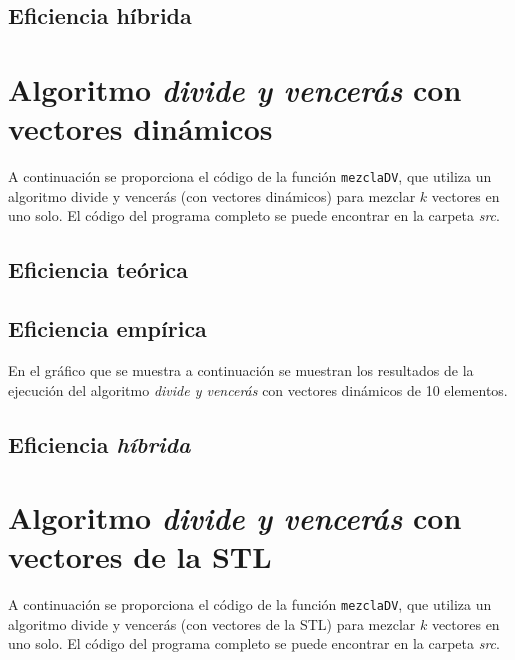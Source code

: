 \documentclass[11pt]{article}
\begin{document}
 \subsection*{Eficiencia híbrida}

\section*{Algoritmo \textit{divide y vencerás} con vectores dinámicos}

A continuación se proporciona el código de la función \texttt{mezclaDV},
que utiliza un algoritmo divide y vencerás (con vectores dinámicos) para mezclar $k$ vectores en uno solo. El
código del programa completo se puede encontrar en la carpeta \textit{src}.\\



\subsection*{Eficiencia teórica}

\subsection*{Eficiencia empírica}

En el gráfico que se muestra a continuación se muestran los resultados de la
ejecución del algoritmo \textit{divide y vencerás} con vectores dinámicos de 10 elementos.

\begin{center}
	
\end{center}

\subsection*{Eficiencia \textit{híbrida}}

\section*{Algoritmo \textit{divide y vencerás} con vectores de la STL}


A continuación se proporciona el código de la función \texttt{mezclaDV},
que utiliza un algoritmo divide y vencerás (con vectores de la STL) para mezclar $k$ vectores en uno solo. El
código del programa completo se puede encontrar en la carpeta \textit{src}.\\
\end{document}

